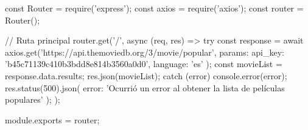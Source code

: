 const { Router } = require('express');
const axios = require('axios');
const router = Router();

// Ruta principal
router.get('/', async (req, res) => {
  try {
    const response = await axios.get('https://api.themoviedb.org/3/movie/popular', {
      params: {
        api_key: 'b45c71139c410b3bdd8e814b3560a0d0',
        language: 'es'
      }
    });
    const movieList = response.data.results;
    res.json(movieList);
  } catch (error) {
    console.error(error);
    res.status(500).json({ error: 'Ocurrió un error al obtener la lista de películas populares' });
  }
});

module.exports = router;
